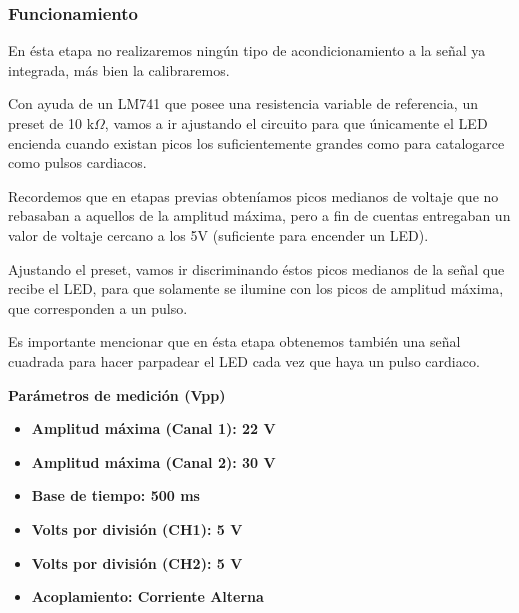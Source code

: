 \documentclass[12pt]{article}
\begin{document}
            \subsubsection{Funcionamiento}
            En ésta etapa no realizaremos ningún tipo de acondicionamiento a la señal ya integrada, más bien la calibraremos.
            
            Con ayuda de un LM741 que posee una resistencia variable de referencia, un preset de 10 k$\Omega$, vamos a ir ajustando el circuito para que únicamente el LED encienda cuando existan picos los suficientemente grandes como para catalogarce como pulsos cardiacos.
            
            Recordemos que en etapas previas obteníamos picos medianos de voltaje que no rebasaban a aquellos de la amplitud máxima, pero a fin de cuentas entregaban un valor de voltaje cercano a los 5V (suficiente para encender un LED).
            
            Ajustando el preset, vamos ir discriminando éstos picos medianos de la señal que recibe el LED, para que solamente se ilumine con los picos de amplitud máxima, que corresponden a un pulso. 
            
            Es importante mencionar que en ésta etapa obtenemos también una señal cuadrada para hacer parpadear el LED cada vez que haya un pulso cardiaco.
            
            \textbf{Parámetros de medición (Vpp)}
            \begin{multicols}{2}
                \begin{itemize}
                    \item[\checkmark] \textbf{Amplitud máxima (Canal 1): 22 V}
                
                    \item[\checkmark] \textbf{Amplitud máxima (Canal 2): 30 V}
                    \item[\checkmark] \textbf{Base de tiempo: 500 ms}
            \columnbreak
                    \item[\checkmark] \textbf{Volts por división (CH1): 5 V}
                    \item[\checkmark] \textbf{Volts por división (CH2): 5 V}
                    \item[\checkmark] \textbf{Acoplamiento: Corriente Alterna}
                \end{itemize}
            \end{multicols}
            
\end{document}
